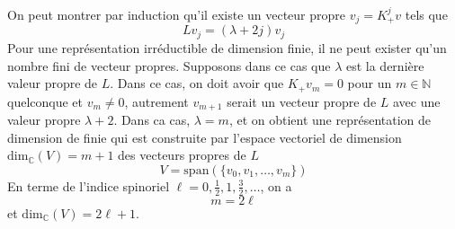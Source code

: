 \documentclass{article}
\numberwithin{equation}{section}
\theoremstyle{solution}
\begin{document}
On peut montrer par induction qu'il existe un vecteur propre $v_{j} = K_{+}^{j}v$ tels que
\begin{equation}
        L v_j = (\lambda + 2 j) v_{j} 
\end{equation} 
Pour une représentation irréductible de dimension finie, il ne peut exister qu'un nombre fini de vecteur propres. 
Supposons dans ce cas que $\lambda$ est la dernière valeur propre de $L$.
Dans ce cas, on doit avoir que $K_{+} v_m = 0$ pour un $m \in \mathbb{N}$ quelconque et $v_{m} \not= 0$, 
autrement $v_{m+1}$ serait un vecteur propre de $L$ avec une valeur propre $\lambda + 2$. 
Dans ca cas, $\lambda = m$, et on obtient une représentation de dimension de finie qui est construite par 
l'espace vectoriel de dimension $\mathrm{dim}_{\mathbb{C}}(V) = m+1$ des vecteurs propres de $L$
\begin{equation}
        V = \mathrm{span}(\{v_{0}, v_1, \dots, v_m\})
\end{equation} 
En terme de l'indice spinoriel $\ell = 0, \frac{1}{2}, 1, \frac{3}{2}, \dots$, on a
\begin{equation}
       m = 2 \ell 
\end{equation} 
et $\mathrm{dim}_{\mathbb{C}}(V) = 2\ell + 1$.
\end{document}
